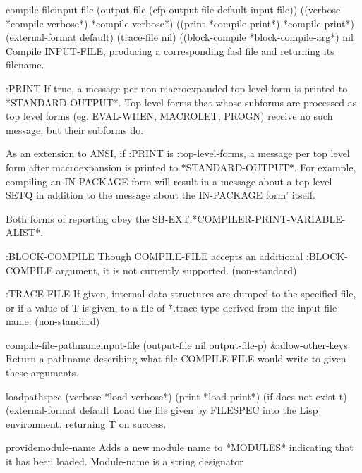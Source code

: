 \begin{function}{compile-file}{input-file \key (output-file (cfp-output-file-default input-file))
 ((verbose *compile-verbose*) *compile-verbose*)
 ((print *compile-print*) *compile-print*) (external-format default)
 (trace-file nil) ((block-compile *block-compile-arg*) nil}{}
  Compile INPUT-FILE, producing a corresponding fasl file and
returning its filename.

  :PRINT
     If true, a message per non-macroexpanded top level form is printed
     to *STANDARD-OUTPUT*. Top level forms that whose subforms are
     processed as top level forms (eg. EVAL-WHEN, MACROLET, PROGN) receive
     no such message, but their subforms do.

     As an extension to ANSI, if :PRINT is :top-level-forms, a message
     per top level form after macroexpansion is printed to *STANDARD-OUTPUT*.
     For example, compiling an IN-PACKAGE form will result in a message about
     a top level SETQ in addition to the message about the IN-PACKAGE form'
     itself.

     Both forms of reporting obey the SB-EXT:*COMPILER-PRINT-VARIABLE-ALIST*.

  :BLOCK-COMPILE
     Though COMPILE-FILE accepts an additional :BLOCK-COMPILE
     argument, it is not currently supported. (non-standard)

  :TRACE-FILE
     If given, internal data structures are dumped to the specified
     file, or if a value of T is given, to a file of *.trace type
     derived from the input file name. (non-standard)
\end{function}

\begin{function}{compile-file-pathname}{input-file \key (output-file nil output-file-p) &allow-other-keys}{}
  Return a pathname describing what file COMPILE-FILE would write to given
   these arguments.
\end{function}

\begin{function}{load}{pathspec \key (verbose *load-verbose*) (print *load-print*)
 (if-does-not-exist t) (external-format default}{}
  Load the file given by FILESPEC into the Lisp environment, returning
   T on success.
\end{function}

\begin{function}{provide}{module-name}{}
  Adds a new module name to *MODULES* indicating that it has been loaded.
   Module-name is a string designator
\end{function}

